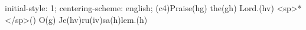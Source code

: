 initial-style: 1;
centering-scheme: english;
(c4)Praise(hg) the(gh) Lord.(hv) <sp>*</sp>() O(g) Je(hv)ru(iv)sa(h)lem.(h)
